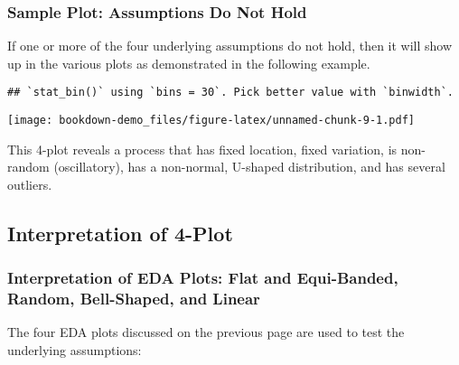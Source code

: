\documentclass[]{book}
\newenvironment{Shaded}{\begin{snugshade}}{\end{snugshade}}
\newcommand{\KeywordTok}[1]{\textcolor[rgb]{0.13,0.29,0.53}{\textbf{#1}}}
\newcommand{\DataTypeTok}[1]{\textcolor[rgb]{0.13,0.29,0.53}{#1}}
\newcommand{\DecValTok}[1]{\textcolor[rgb]{0.00,0.00,0.81}{#1}}
\newcommand{\StringTok}[1]{\textcolor[rgb]{0.31,0.60,0.02}{#1}}
\newcommand{\OtherTok}[1]{\textcolor[rgb]{0.56,0.35,0.01}{#1}}
\newcommand{\OperatorTok}[1]{\textcolor[rgb]{0.81,0.36,0.00}{\textbf{#1}}}
\newcommand{\NormalTok}[1]{#1}
\theoremstyle{definition}
\theoremstyle{definition}
\theoremstyle{definition}
\theoremstyle{remark}
\begin{document}
\subsubsection{Sample Plot: Assumptions Do Not
Hold}\label{sample-plot-assumptions-do-not-hold}

If one or more of the four underlying assumptions do not hold, then it
will show up in the various plots as demonstrated in the following
example.

\begin{Shaded}
\end{Shaded}

\begin{verbatim}
## `stat_bin()` using `bins = 30`. Pick better value with `binwidth`.
\end{verbatim}

\texttt{[image: bookdown-demo\_files/figure-latex/unnamed-chunk-9-1.pdf]}

This 4-plot reveals a process that has fixed location, fixed variation,
is non-random (oscillatory), has a non-normal, U-shaped distribution,
and has several outliers.

\subsection{Interpretation of 4-Plot}\label{interpretation-of-4-plot}

\subsubsection{Interpretation of EDA Plots: Flat and Equi-Banded,
Random, Bell-Shaped, and
Linear}\label{interpretation-of-eda-plots-flat-and-equi-banded-random-bell-shaped-and-linear}

The four EDA plots discussed on the previous page are used to test the
underlying assumptions:
\end{document}
